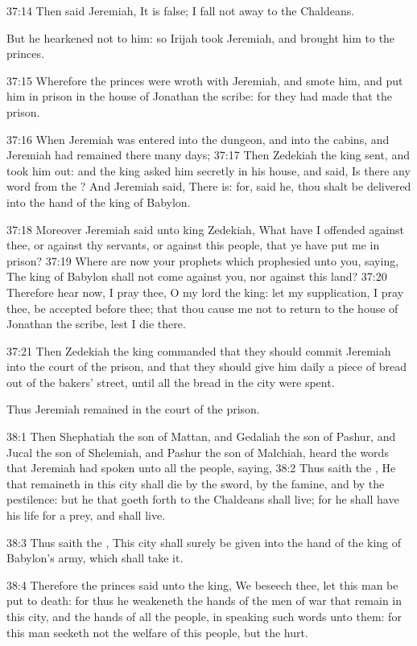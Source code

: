 37:14 Then said Jeremiah, It is false; I fall not away to the Chaldeans.

But he hearkened not to him: so Irijah took Jeremiah, and brought him to the princes.

37:15 Wherefore the princes were wroth with Jeremiah, and smote him, and put him in prison in the house of Jonathan the scribe: for they had made that the prison.

37:16 When Jeremiah was entered into the dungeon, and into the cabins, and Jeremiah had remained there many days; 37:17 Then Zedekiah the king sent, and took him out: and the king asked him secretly in his house, and said, Is there any word from the \LORD? And Jeremiah said, There is: for, said he, thou shalt be delivered into the hand of the king of Babylon.

37:18 Moreover Jeremiah said unto king Zedekiah, What have I offended against thee, or against thy servants, or against this people, that ye have put me in prison?  37:19 Where are now your prophets which prophesied unto you, saying, The king of Babylon shall not come against you, nor against this land?  37:20 Therefore hear now, I pray thee, O my lord the king: let my supplication, I pray thee, be accepted before thee; that thou cause me not to return to the house of Jonathan the scribe, lest I die there.

37:21 Then Zedekiah the king commanded that they should commit Jeremiah into the court of the prison, and that they should give him daily a piece of bread out of the bakers' street, until all the bread in the city were spent.

Thus Jeremiah remained in the court of the prison.

38:1 Then Shephatiah the son of Mattan, and Gedaliah the son of Pashur, and Jucal the son of Shelemiah, and Pashur the son of Malchiah, heard the words that Jeremiah had spoken unto all the people, saying, 38:2 Thus saith the \LORD, He that remaineth in this city shall die by the sword, by the famine, and by the pestilence: but he that goeth forth to the Chaldeans shall live; for he shall have his life for a prey, and shall live.

38:3 Thus saith the \LORD, This city shall surely be given into the hand of the king of Babylon's army, which shall take it.

38:4 Therefore the princes said unto the king, We beseech thee, let this man be put to death: for thus he weakeneth the hands of the men of war that remain in this city, and the hands of all the people, in speaking such words unto them: for this man seeketh not the welfare of this people, but the hurt.

